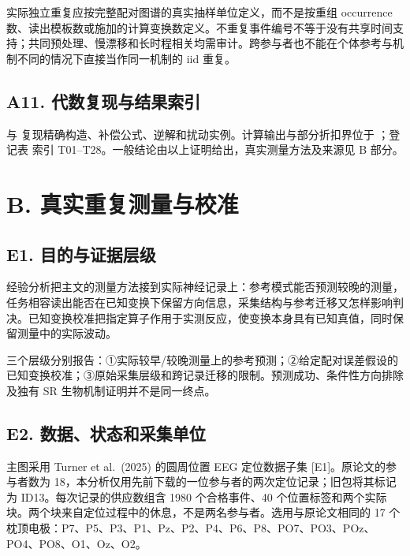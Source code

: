 \documentclass[11pt,a4paper]{article}
\begin{document}
实际独立重复应按完整配对图谱的真实抽样单位定义，而不是按重组 occurrence
数、读出模板数或施加的计算变换数定义。不重复事件编号不等于没有共享时间支持；共同预处理、慢漂移和长时程相关均需审计。跨参与者也不能在个体参考与机制不同的情况下直接当作同一机制的
iid 重复。

\subsection{A11.
代数复现与结果索引}\label{a11.-ux4ee3ux6570ux590dux73b0ux4e0eux7ed3ux679cux7d22ux5f15}

 与 
复现精确构造、补偿公式、逆解和扰动实例。计算输出与部分折扣界位于
；登记表  索引
T01–T28。一般结论由以上证明给出，真实测量方法及来源见 B 部分。

\clearpage

\section{B.
真实重复测量与校准}\label{b.-ux771fux5b9eux91cdux590dux6d4bux91cfux4e0eux6821ux51c6}

\subsection{E1.
目的与证据层级}\label{e1.-ux76eeux7684ux4e0eux8bc1ux636eux5c42ux7ea7}

经验分析把主文的测量方法接到实际神经记录上：参考模式能否预测较晚的测量，任务相容读出能否在已知变换下保留方向信息，采集结构与参考迁移又怎样影响判决。已知变换校准把指定算子作用于实测反应，使变换本身具有已知真值，同时保留测量中的实际波动。

三个层级分别报告：①实际较早/较晚测量上的参考预测；②给定配对误差假设的已知变换校准；③原始采集层级和跨记录迁移的限制。预测成功、条件性方向排除及独有
SR 生物机制证明并不是同一终点。

\subsection{E2.
数据、状态和采集单位}\label{e2.-ux6570ux636eux72b6ux6001ux548cux91c7ux96c6ux5355ux4f4d}

主图采用 Turner et al.~(2025) 的圆周位置 EEG 定位数据子集
{[}E1{]}。原论文的参与者数为
18，本分析仅用先前下载的一位参与者的两次定位记录；旧包将其标记为
ID13。每次记录的供应数组含 1980 个合格事件、40
个位置标签和两个实际块。两个块来自定位过程中的休息，不是两名参与者。选用与原论文相同的
17
个枕顶电极：P7、P5、P3、P1、Pz、P2、P4、P6、P8、PO7、PO3、POz、PO4、PO8、O1、Oz、O2。
\end{document}
